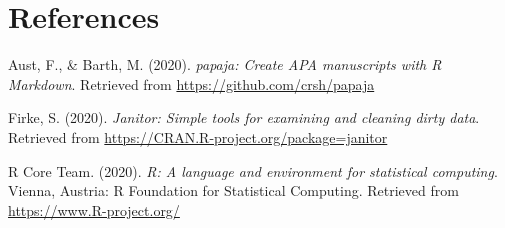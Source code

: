 \documentclass[english,jou]{apa6}
\begin{document}
\newpage

\hypertarget{references}{%
\section{References}\label{references}}

\begingroup
\setlength{\parindent}{-0.5in}
\setlength{\leftskip}{0.5in}

\hypertarget{refs}{}
\leavevmode\hypertarget{ref-R-papaja}{}%
Aust, F., \& Barth, M. (2020). \emph{papaja: Create APA manuscripts with R Markdown}. Retrieved from \url{https://github.com/crsh/papaja}

\leavevmode\hypertarget{ref-R-janitor}{}%
Firke, S. (2020). \emph{Janitor: Simple tools for examining and cleaning dirty data}. Retrieved from \url{https://CRAN.R-project.org/package=janitor}

\leavevmode\hypertarget{ref-R-base}{}%
R Core Team. (2020). \emph{R: A language and environment for statistical computing}. Vienna, Austria: R Foundation for Statistical Computing. Retrieved from \url{https://www.R-project.org/}

\endgroup
\end{document}
